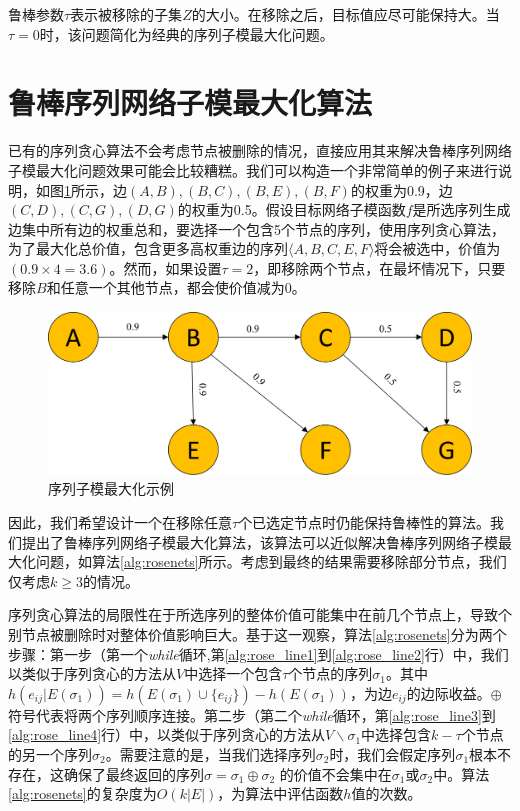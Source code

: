鲁棒参数\(\tau\)表示被移除的子集\(Z\)的大小。在移除之后，目标值应尽可能保持大。当\(\tau = 0\)时，该问题简化为经典的序列子模最大化问题\cite{mitrovic2018submodularity}。

\section{鲁棒序列网络子模最大化算法}
\label{sec:3_2}

已有的序列贪心算法\cite{mitrovic2018submodularity}不会考虑节点被删除的情况，直接应用其来解决鲁棒序列网络子模最大化问题效果可能会比较糟糕。我们可以构造一个非常简单的例子来进行说明，如图\ref{fig:rose_sample}所示，边$(A,B),(B,C),(B,E),(B,F)$的权重为0.9，边$(C,D),(C,G),(D,G)$的权重为0.5。假设目标网络子模函数\(f\)是所选序列生成边集中所有边的权重总和，要选择一个包含5个节点的序列，使用序列贪心算法，为了最大化总价值，包含更多高权重边的序列\(\langle A,B,C,E,F \rangle\)将会被选中，价值为\((0.9 \times 4 = 3.6)\)。然而，如果设置\(\tau=2\)，即移除两个节点，在最坏情况下，只要移除\(B\)和任意一个其他节点，都会使价值减为$0$。

\begin{figure}[th]
    \centering
    \includegraphics[width=.89\linewidth]{figure/rosenets/sample2}
    \caption{序列子模最大化示例}
    \label{fig:rose_sample}
\end{figure}

因此，我们希望设计一个在移除任意$\tau$个已选定节点时仍能保持鲁棒性的算法。我们提出了鲁棒序列网络子模最大化算法，该算法可以近似解决鲁棒序列网络子模最大化问题，如算法\ref{alg:rosenets}所示。考虑到最终的结果需要移除部分节点，我们仅考虑$k \ge 3$的情况。

序列贪心算法的局限性在于所选序列的整体价值可能集中在前几个节点上，导致个别节点被删除时对整体价值影响巨大。基于这一观察，算法\ref{alg:rosenets}分为两个步骤：第一步（第一个\textit{while}循环,第\ref{alg:rose_line1}到\ref{alg:rose_line2}行）中，我们以类似于序列贪心的方法从\(V\)中选择一个包含\(\tau\)个节点的序列\(\sigma_1\)。其中$h(e_{ij}|E(\sigma_1))=h(E(\sigma_1)\cup\{e_{ij}\})-h(E(\sigma_1))$，为边$e_{ij}$的边际收益。$\oplus$符号代表将两个序列顺序连接。第二步（第二个\textit{while}循环，第\ref{alg:rose_line3}到\ref{alg:rose_line4}行）中，以类似于序列贪心的方法从\(V\backslash \sigma_1\)中选择包含\(k-\tau\)个节点的另一个序列\(\sigma_2\)。需要注意的是，当我们选择序列\(\sigma_2\)时，我们会假定序列\(\sigma_1\)根本不存在，这确保了最终返回的序列\(\sigma = \sigma_1 \oplus \sigma_2\) 的价值不会集中在\(\sigma_1\)或\(\sigma_2\)中。算法\ref{alg:rosenets}的复杂度为\(O(k|E|)\)，为算法中评估函数$h$值的次数。

